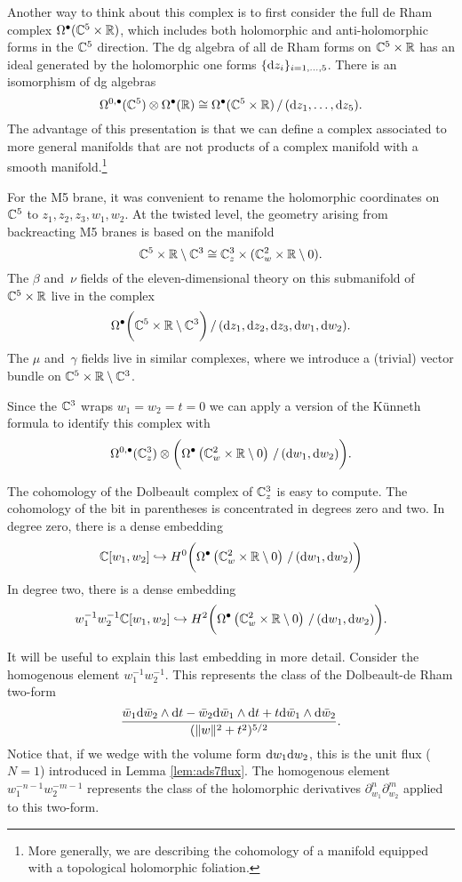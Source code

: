Another way to think about this complex is to first consider the full de Rham complex $\Omega^\bullet(\mathbb{C}^5 \times \mathbb{R})$, which includes both holomorphic and anti-holomorphic forms in the $\mathbb{C}^5$ direction. 
The dg algebra of all de Rham forms on $\mathbb{C}^5 \times \mathbb{R}$ has an ideal generated by the holomorphic one forms $\{\mathrm{d} z_i\}_{i=1,\ldots,5}$.
There is an isomorphism of dg algebras
\[
\Omega^{0,\bullet}(\mathbb{C}^5) \otimes \Omega^\bullet(\mathbb{R}) \cong \Omega^\bullet(\mathbb{C}^5 \times \mathbb{R}) \, / \, (\mathrm{d} z_1,\ldots, \mathrm{d} z_5) .
\]
The advantage of this presentation is that we can define a complex associated to more general manifolds that are not products of a complex manifold with a smooth manifold.\footnote{More generally, we are describing the cohomology of a manifold equipped with a topological holomorphic foliation.}

For the M5 brane, it was convenient to rename the holomorphic coordinates on $\mathbb{C}^5$ to $z_1,z_2,z_3,w_1,w_2$. 
At the twisted level, the geometry arising from backreacting M5 branes is based on the manifold 
\[
\mathbb{C}^5 \times \mathbb{R} \setminus \mathbb{C}^3 \cong \mathbb{C}_z^3 \times (\mathbb{C}^2_w \times \mathbb{R} \setminus 0) .
\]
The $\beta$ and~$\nu$ fields of the eleven-dimensional theory on this submanifold of $\mathbb{C}^5 \times \mathbb{R}$ live in the complex 
\[
\Omega^\bullet\bigg(\mathbb{C}^5 \times \mathbb{R} \setminus \mathbb{C}^3\bigg) \, / \, (\mathrm{d} z_1,\mathrm{d} z_2,\mathrm{d} z_3, \mathrm{d} w_1, \mathrm{d} w_2)  .
\]
The $\mu$ and~$\gamma$ fields live in similar complexes, where we introduce a (trivial) vector bundle on $\mathbb{C}^5 \times \mathbb{R} \setminus \mathbb{C}^3$. 

Since the $\mathbb{C}^3$ wraps $w_1=w_2=t=0$ we can apply a version of the K\"unneth formula to identify this complex with 
\[
\Omega^{0,\bullet}(\mathbb{C}^3_z) \otimes \bigg( \Omega^\bullet\left(\mathbb{C}^2_w \times \mathbb{R} \setminus 0 \right) \, / \, (\mathrm{d} w_1, \mathrm{d} w_2) \bigg).
\]

The cohomology of the Dolbeault complex of $\mathbb{C}^3_z$ is easy to compute. 
The cohomology of the bit in parentheses is concentrated in degrees zero and two. 
In degree zero, there is a dense embedding
\[
\mathbb{C}[w_1,w_2] \hookrightarrow H^0 \bigg( \Omega^\bullet\left(\mathbb{C}^2_w \times \mathbb{R} \setminus 0 \right) \, / \, (\mathrm{d} w_1, \mathrm{d} w_2) \bigg)
\]
In degree two, there is a dense embedding
\[
w_{1}^{-1} w_2^{-1} \mathbb{C}[w_1,w_2] \hookrightarrow H^2 \bigg( \Omega^\bullet\left(\mathbb{C}^2_w \times \mathbb{R} \setminus 0 \right) \, / \, (\mathrm{d} w_1, \mathrm{d} w_2) \bigg).
\]

It will be useful to explain this last embedding in more detail. 
Consider the homogenous element $w_1^{-1} w_2^{-1}$. 
This represents the class of the Dolbeault-de Rham two-form
\[
\frac{\bar{w}_1 \mathrm{d} \bar{w}_2 \wedge \mathrm{d} t - \bar{w}_2 \mathrm{d} \bar{w}_1 \wedge \mathrm{d} t + t \mathrm{d} \bar{w}_1 \wedge \mathrm{d} \bar{w}_2}{(\|w\|^2 + t^2)^{5/2}} .
\]
Notice that, if we wedge with the volume form $\mathrm{d} w_1 \mathrm{d} w_2$, this is the unit  flux ($N=1$) introduced in Lemma \ref{lem:ads7flux}. 
The homogenous element $w_1^{-n-1} w_2^{-m-1}$ represents the class of the holomorphic derivatives $\partial_{w_1}^n \partial_{w_2}^{m}$ applied to this two-form. 

